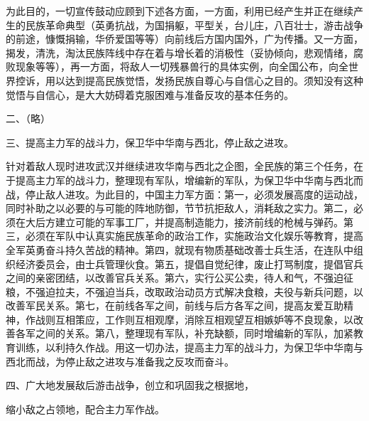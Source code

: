 为此目的，一切宣传鼓动应顾到下述各方面，一方面，利用已经产生并正在继续产生的民族革命典型（英勇抗战，为国捐躯，平型关，台儿庄，八百壮士，游击战争的前途，慷慨捐输，华侨爱国等等）向前线后方国内国外，广为传播。又一方面，揭发，清洗，淘汰民族阵线中存在着与增长着的消极性（妥协倾向，悲观情绪，腐败现象等等），再一方面，将敌人一切残暴兽行的具体实例，向全国公布，向全世界控诉，用以达到提高民族觉悟，发扬民族自尊心与自信心之目的。须知没有这种觉悟与自信心，是大大妨碍着克服困难与准备反攻的基本任务的。

二、（略）

三、提高主力军的战斗力，保卫华中华南与西北，停止敌之进攻。

针对着敌人现时进攻武汉并继续进攻华南与西北之企图，全民族的第三个任务，在于提高主力军的战斗力，整理现有军队，增编新的军队，为保卫华中华南与西北而战，停止敌人进攻。为此目的，中国主力军方面：第一，必须发展高度的运动战，同时补助之以必要的与可能的阵地防御，节节抗拒敌人，消耗敌之实力。第二，必须在大后方建立可能的军事工厂，并提高制造能力，接济前线的枪械与弹药。第三，必须在军队中认真实施民族革命的政治工作，实施政治文化娱乐等教育，提高全军英勇奋斗持久苦战的精神。第四，就现有物质基础改善士兵生活，在连队中组织经济委员会，由士兵管理伙食。第五，提倡自觉纪律，废止打骂制度，提倡官兵之间的亲密团结，以改善官兵关系。第六，实行公买公卖，待人和气，不强迫征粮，不强迫拉夫，不强迫当兵，改取政治动员方式解决食粮，夫役与新兵问题，以改善军民关系。第七，在前线各军之间，前线与后方各军之间，提高友爱互助精神，作战则互相策应，工作则互相观摩，消除互相观望互相嫉妒等不良现象，以改善各军之间的关系。第八，整理现有军队，补充缺额，同时增编新的军队，加紧教育训练，以利持久作战。用这一切办法，提高主力军的战斗力，为保卫华中华南与西北而战，为停止敌之进攻与准备我之反攻而奋斗。

四、广大地发展敌后游击战争，创立和巩固我之根据地，

缩小敌之占领地，配合主力军作战。

